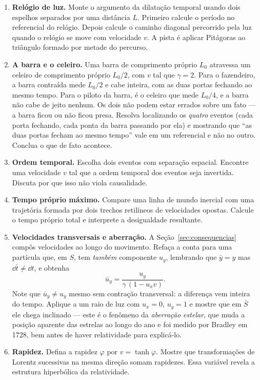 \documentclass[12pt,a4paper,oneside]{book}
\theoremstyle{rgplain}
\theoremstyle{rgremark}
\begin{document}
\begin{enumerate}
  \item \textbf{Relógio de luz.} Monte o argumento da dilatação temporal usando
  dois espelhos separados por uma distância $L$. Primeiro calcule o período no
  referencial do relógio. Depois calcule o caminho diagonal percorrido pela luz
  quando o relógio se move com velocidade $v$. A pista é aplicar Pitágoras ao
  triângulo formado por metade do percurso.

  \item \textbf{A barra e o celeiro.} Uma barra de comprimento próprio $L_0$
  atravessa um celeiro de comprimento próprio $L_0/2$, com $v$ tal que
  $\gamma=2$. Para o fazendeiro, a barra contraída mede $L_0/2$ e cabe
  inteira, com as duas portas fechando ao mesmo tempo. Para o piloto da barra,
  é o celeiro que mede $L_0/4$, e a barra não cabe de jeito nenhum. Os dois
  não podem estar errados sobre um fato --- a barra ficou ou não ficou presa.
  Resolva localizando os \emph{quatro} eventos (cada porta fechando, cada
  ponta da barra passando por ela) e mostrando que ``as duas portas fecham ao
  mesmo tempo'' vale em um referencial e não no outro. Conclua o que de fato
  acontece.

  \item \textbf{Ordem temporal.} Escolha dois eventos com separação espacial.
  Encontre uma velocidade $v$ tal que a ordem temporal dos eventos seja
  invertida. Discuta por que isso não viola causalidade.

  \item \textbf{Tempo próprio máximo.} Compare uma linha de mundo inercial com
  uma trajetória formada por dois trechos retilíneos de velocidades opostas.
  Calcule o tempo próprio total e interprete a desigualdade resultante.

  \item \label{item-adicao-velocidades} \textbf{Velocidades transversais e
  aberração.} A Seção~\ref{sec:consequencias} compôs velocidades ao longo do
  movimento. Refaça a conta para uma partícula que, em $S$, tem
  \emph{também} componente $u_y$, lembrando que $\bar y=y$ mas $\dd \bar t\ne\dd t$,
  e obtenha
  \[
    \bar u_y=\frac{u_y}{\gamma\,(1-u_xv)} .
  \]
  Note que $\bar u_y\ne u_y$ mesmo sem contração transversal: a diferença vem
  inteira do tempo. Aplique a um raio de luz com $u_x=0$, $u_y=1$ e mostre que
  em $\bar S$ ele chega inclinado --- este é o fenômeno da \emph{aberração
  estelar}, que muda a posição aparente das estrelas ao longo do ano e foi
  medido por Bradley em 1728, bem antes de haver relatividade para explicá-lo.

  \item \textbf{Rapidez.} Defina a rapidez $\varphi$ por $v=\tanh\varphi$.
  Mostre que transformações de Lorentz sucessivas na mesma direção somam
  rapidezes. Essa variável revela a estrutura hiperbólica da relatividade.
\end{enumerate}
\end{document}
